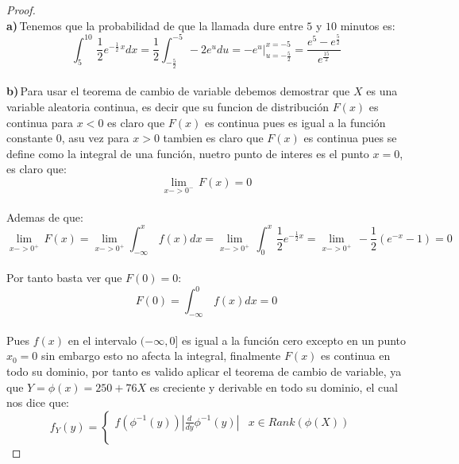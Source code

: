 \documentclass[11pt,letterpaper]{article}
\begin{document}
\begin{proof}\,\\
  \textbf{a)}\,Tenemos que la probabilidad de que la llamada dure entre $5$ y $10$ minutos es:\,\\
  \begin{equation*}
    \int_{5}^{10}\,\frac{1}{2}e^{-\frac{1}{2}\,x}dx=\frac{1}{2}\int_{-\frac{5}{2}}^{-5}\,-2e^udu=-e^{u}\big|_{u = -\frac{5}{2}}^{x = -5}=\frac{e^5-e^{\frac{5}{2}}}{e^{\frac{15}{2}}}
  \end{equation*}\,\\
  \textbf{b)}\,Para usar el teorema de cambio de variable debemos demostrar que $X$ es una variable aleatoria continua, es decir que su funcion de distribuci\'on $F(x)$ es continua para $x<0$ es claro que $F(x)$ es continua pues es igual a la funci\'on
  constante $0$, asu vez para $x>0$ tambien es claro que $F(x)$ es continua pues se define como la integral de una funci\'on, nuetro punto de interes es el punto $x=0$, es claro que:\,\\
  \begin{equation*}
    \lim_{x->0^-}\,F(x)=0
  \end{equation*}\,\\
  Ademas de que:\,\\
  \begin{equation*}
    \lim_{x->0^+}\,F(x)=\lim_{x->0^+}\int_{-\infty}^{x}\,f(x)dx=\lim_{x->0^+}\,\int_{0}^{x}\,\frac{1}{2}e^{-\frac{1}{2}x}=\lim_{x->0^+}\,-\frac{1}{2}\left(e^{-x}-1\right)=0
  \end{equation*}\,\\
  Por tanto basta ver que $F(0)=0$:\,\\
  \begin{equation*}
    F(0)=\int_{-\infty}^{0}\,f(x)dx=0
  \end{equation*}\,\\
  Pues $f(x)$ en el intervalo $(-\infty,0]$ es igual a la funci\'on cero excepto en un punto $x_0=0$ sin embargo esto no afecta la integral, finalmente $F(x)$ es continua en todo su dominio, por tanto es valido aplicar el teorema 
  de cambio de variable, ya que $Y=\phi(x)=250+76X$ es creciente y derivable en todo su dominio, el cual nos dice que:\,\\
  \begin{equation*}
    f_Y(y)=\left\{ \begin{array}{rcl}
f(\phi^{-1}(y))\left|\frac{d}{dy}\phi^{-1}(y)\right| & x \in Rank(\phi(X))\\
& & \\

\end{array}
\end{equation*}
\end{proof}
\end{document}

